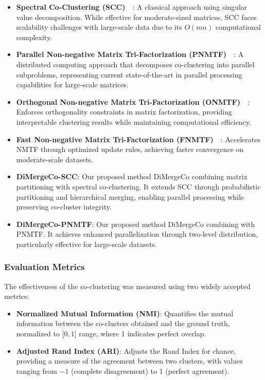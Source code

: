 \documentclass[journal]{IEEEtran}
\renewcommand{\cite}[1]{~\autocite{#1}}
\begin{document}
\begin{itemize}
    \item \textbf{Spectral Co-Clustering (SCC)}~\cite{dhillon2001CoclusteringDocumentsWords}:
          A classical approach using singular value decomposition. While effective for moderate-sized matrices, SCC faces scalability challenges with large-scale data due to its $O(mn)$ computational complexity.

    \item \textbf{Parallel Non-negative Matrix Tri-Factorization (PNMTF)}~\cite{chen2023ParallelNonNegativeMatrix}:
          A distributed computing approach that decomposes co-clustering into parallel subproblems, representing current state-of-the-art in parallel processing capabilities for large-scale matrices.

    \item \textbf{Orthogonal Non-negative Matrix Tri-Factorization (ONMTF)}~\cite{ding2006OrthogonalNonnegativeMatrix}:
          Enforces orthogonality constraints in matrix factorization, providing interpretable clustering results while maintaining computational efficiency.

    \item \textbf{Fast Non-negative Matrix Tri-Factorization (FNMTF)}~\cite{kim2011FastNonnegativeMatrix}:
          Accelerates NMTF through optimized update rules, achieving faster convergence on moderate-scale datasets.

    \item \textbf{DiMergeCo-SCC}:
          Our proposed method DiMergeCo combining matrix partitioning with spectral co-clustering. It extends SCC through probabilistic partitioning and hierarchical merging, enabling parallel processing while preserving co-cluster integrity.

    \item \textbf{DiMergeCo-PNMTF}:
          Our proposed method DiMergeCo combining with PNMTF. It achieves enhanced parallelization through two-level distribution, particularly effective for large-scale datasets.
\end{itemize}

\subsubsection{Evaluation Metrics}
The effectiveness of the co-clustering was measured using two widely accepted metrics:
\begin{itemize}
    \item \textbf{Normalized Mutual Information (NMI)}: Quantifies the mutual information between the co-clusters obtained and the ground truth, normalized to \(\lbrack 0,1 \rbrack \) range, where 1 indicates perfect overlap.
    \item \textbf{Adjusted Rand Index (ARI)}: Adjusts the Rand Index for chance, providing a measure of the agreement between two clusters, with values ranging from $-1$ (complete disagreement) to 1 (perfect agreement).
\end{itemize}
\end{document}
